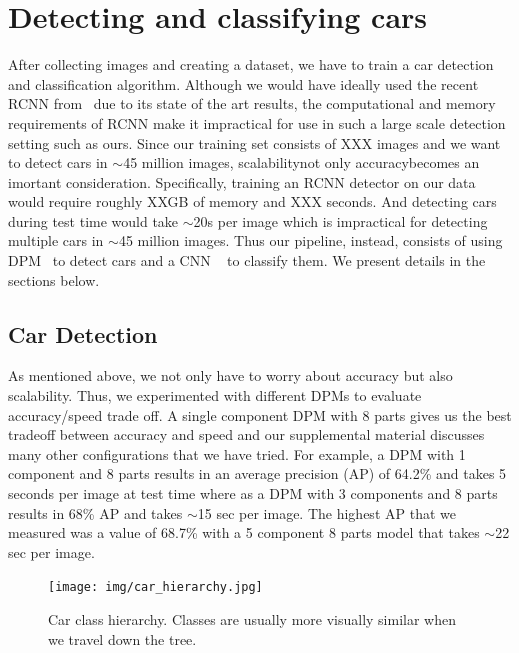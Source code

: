 \documentclass[10pt,twocolumn,letterpaper]{article}
\begin{document}
\section{Detecting and classifying cars}
After collecting images and creating a dataset, we have to train a car detection and classification algorithm. Although we would have ideally used the recent RCNN from~\cite{rcnn} due to its state of the art results, the computational and memory requirements of RCNN make it impractical for use in such a large scale detection setting such as ours. Since our training set consists of XXX images and we want to detect cars in \(\sim\)45 million images, scalability\textemdash not only accuracy\textemdash becomes an imortant consideration. Specifically, training an RCNN detector on our data would require roughly XXGB of memory and XXX seconds. And detecting cars during test time would take \(\sim\)20s per image which is impractical for detecting multiple cars in \(\sim\)45 million images. Thus our pipeline, instead, consists of using DPM~\cite{dpm} to detect cars and a CNN ~\cite{alexnet} to classify them. We present details in the sections below.

\subsection{Car Detection}
As mentioned above, we not only have to worry about accuracy but also scalability. Thus, we experimented with different DPMs to evaluate accuracy/speed trade off. A single component DPM with 8 parts gives us the best tradeoff between accuracy and speed and our supplemental material discusses many other configurations that we have tried. For example, a DPM with 1 component and 8 parts results in an average precision (AP) of 64.2\% and takes 5 seconds per image at test time where as a DPM with 3 components and 8 parts results in 68\% AP and takes \(\sim\)15 sec per image. The highest AP that we measured was a value of 68.7\% with a 5 component 8 parts model that takes \(\sim\)22 sec per image. 

\begin{figure} [t]
\begin{center}
\texttt{[image: img/car\_hierarchy.jpg]}
\end{center}
\caption {Car class hierarchy. Classes are usually more visually similar when we travel down the tree.}
\label{fig:hierarchy}
\end{figure}
\end{document}
